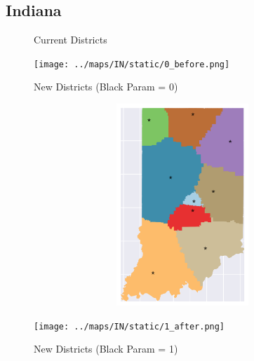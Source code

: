 \subsection{Indiana}
\begin{figure}[htb!] \centering
\caption{ Current Districts }
\texttt{[image: ../maps/IN/static/0\_before.png]}
\caption{ New Districts (Black Param = 0) }
\includegraphics[width=5in,height=3in,keepaspectratio]{../maps/IN/static/0_after.png}
\caption{ New Districts (Black Param = 1) }
\texttt{[image: ../maps/IN/static/1\_after.png]}
\end{figure}

\clearpage
\newpage

